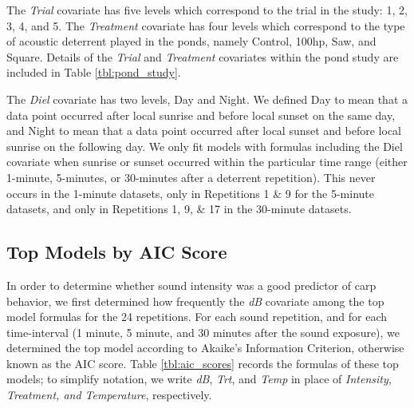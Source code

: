 \documentclass[12pt]{article}
\begin{document}
	The \emph{Trial} covariate has five levels which correspond to the trial in the study: 1, 2, 3, 4, and 5. The \emph{Treatment} covariate has four levels which correspond to the type of acoustic deterrent played in the ponds, namely Control, 100hp, Saw, and Square. Details of the \emph{Trial} and \emph{Treatment} covariates within the pond study are included in Table \ref{tbl:pond_study}.
	
	The \emph{Diel} covariate has two levels, Day and Night. We defined Day to mean that a data point occurred after local sunrise and before local sunset on the same day, and Night to mean that a data point occurred after local sunset and before local sunrise on the following day. We only fit models with formulas including the Diel covariate when sunrise or sunset occurred within the particular time range (either 1-minute, 5-minutes, or 30-minutes after a deterrent repetition). This never occurs in the 1-minute datasets, only in Repetitions 1 \& 9 for the 5-minute datasets, and only in Repetitions 1, 9, \& 17 in the 30-minute datasets.
	
	\subsection{Top Models by AIC Score}
	
	In order to determine whether sound intensity was a good predictor of carp behavior, we first determined how frequently the \emph{dB} covariate among the top model formulas for the 24 repetitions. For each sound repetition, and for each time-interval (1 minute, 5 minute, and 30 minutes after the sound exposure), we determined the top model according to Akaike's Information Criterion, otherwise known as the AIC score. Table \ref{tbl:aic_scores} records the formulas of these top models; to simplify notation, we write \emph{dB}, \emph{Trt}, and \emph{Temp} in place of \emph{Intensity, Treatment, and Temperature}, respectively.
	
\end{document}
